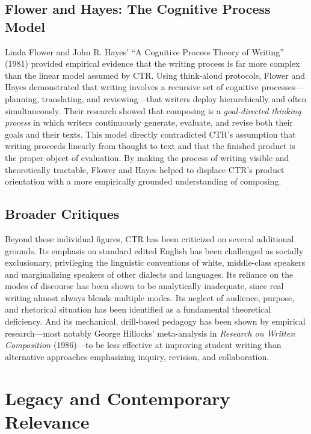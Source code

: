 \documentclass[12pt]{article}
\begin{document}
\subsection{Flower and Hayes: The Cognitive Process Model}

Linda Flower and John R. Hayes' ``A Cognitive Process Theory of Writing'' (1981) provided empirical evidence that the writing process is far more complex than the linear model assumed by CTR. Using think-aloud protocols, Flower and Hayes demonstrated that writing involves a recursive set of cognitive processes---planning, translating, and reviewing---that writers deploy hierarchically and often simultaneously. Their research showed that composing is a \textit{goal-directed thinking process} in which writers continuously generate, evaluate, and revise both their goals and their texts. This model directly contradicted CTR's assumption that writing proceeds linearly from thought to text and that the finished product is the proper object of evaluation. By making the process of writing visible and theoretically tractable, Flower and Hayes helped to displace CTR's product orientation with a more empirically grounded understanding of composing.

\subsection{Broader Critiques}

Beyond these individual figures, CTR has been criticized on several additional grounds. Its emphasis on standard edited English has been challenged as socially exclusionary, privileging the linguistic conventions of white, middle-class speakers and marginalizing speakers of other dialects and languages. Its reliance on the modes of discourse has been shown to be analytically inadequate, since real writing almost always blends multiple modes. Its neglect of audience, purpose, and rhetorical situation has been identified as a fundamental theoretical deficiency. And its mechanical, drill-based pedagogy has been shown by empirical research---most notably George Hillocks' meta-analysis in \textit{Research on Written Composition} (1986)---to be less effective at improving student writing than alternative approaches emphasizing inquiry, revision, and collaboration.

\section{Legacy and Contemporary Relevance}
\end{document}
